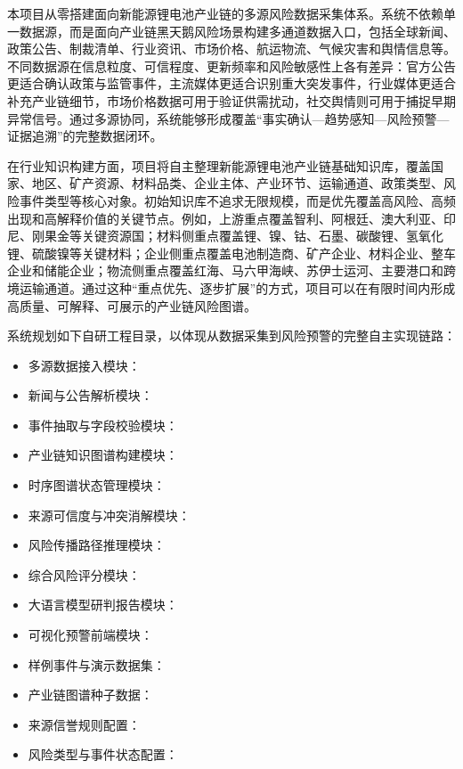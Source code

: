 ﻿\documentclass[12pt,a4paper]{article}
\begin{document}
本项目从零搭建面向新能源锂电池产业链的多源风险数据采集体系。系统不依赖单一数据源，而是面向产业链黑天鹅风险场景构建多通道数据入口，包括全球新闻、政策公告、制裁清单、行业资讯、市场价格、航运物流、气候灾害和舆情信息等。不同数据源在信息粒度、可信程度、更新频率和风险敏感性上各有差异：官方公告更适合确认政策与监管事件，主流媒体更适合识别重大突发事件，行业媒体更适合补充产业链细节，市场价格数据可用于验证供需扰动，社交舆情则可用于捕捉早期异常信号。通过多源协同，系统能够形成覆盖“事实确认—趋势感知—风险预警—证据追溯”的完整数据闭环。

在行业知识构建方面，项目将自主整理新能源锂电池产业链基础知识库，覆盖国家、地区、矿产资源、材料品类、企业主体、产业环节、运输通道、政策类型、风险事件类型等核心对象。初始知识库不追求无限规模，而是优先覆盖高风险、高频出现和高解释价值的关键节点。例如，上游重点覆盖智利、阿根廷、澳大利亚、印尼、刚果金等关键资源国；材料侧重点覆盖锂、镍、钴、石墨、碳酸锂、氢氧化锂、硫酸镍等关键材料；企业侧重点覆盖电池制造商、矿产企业、材料企业、整车企业和储能企业；物流侧重点覆盖红海、马六甲海峡、苏伊士运河、主要港口和跨境运输通道。通过这种“重点优先、逐步扩展”的方式，项目可以在有限时间内形成高质量、可解释、可展示的产业链风险图谱。

系统规划如下自研工程目录，以体现从数据采集到风险预警的完整自主实现链路：
\begin{itemize}
    \item 多源数据接入模块：
    \item 新闻与公告解析模块：
    \item 事件抽取与字段校验模块：
    \item 产业链知识图谱构建模块：
    \item 时序图谱状态管理模块：
    \item 来源可信度与冲突消解模块：
    \item 风险传播路径推理模块：
    \item 综合风险评分模块：
    \item 大语言模型研判报告模块：
    \item 可视化预警前端模块：
    \item 样例事件与演示数据集：
    \item 产业链图谱种子数据：
    \item 来源信誉规则配置：
    \item 风险类型与事件状态配置：
\end{itemize}
\end{document}
